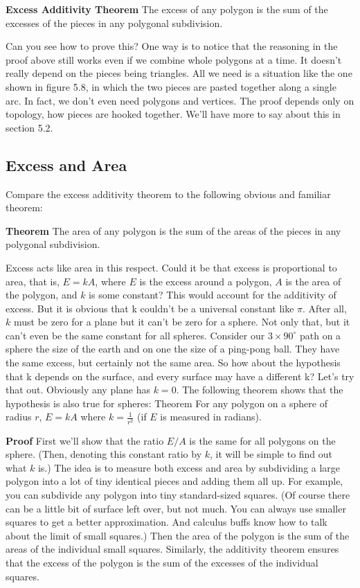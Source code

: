 \documentclass{book}
\begin{document}
\noindent \textbf{Excess Additivity Theorem} The excess of any polygon is the sum of the
excesses of the pieces in any polygonal subdivision.

Can you see how to prove this? One way is to notice that the reasoning
in the proof above still works even if we combine whole polygons at
a time. It doesn't really depend on the pieces being triangles. All we
need is a situation like the one shown in figure 5.8, in which the two
pieces are pasted together along a single arc. In fact, we don't even need
polygons and vertices. The proof depends only on topology, how pieces
are hooked together. We'll have more to say about this in section 5.2.

\subsection{Excess and Area}

Compare the excess additivity theorem to the following obvious and
familiar theorem:

\noindent \textbf{Theorem} The area of any polygon is the sum of the areas of the pieces
in any polygonal subdivision.

Excess acts like area in this respect. Could it be that excess is proportional to area, that is, $E = kA$, where $E$ is the excess around a polygon,
$A$ is the area of the polygon, and $k$ is some constant? This would account 
for the additivity of excess. But it is obvious that k couldn't be
a universal constant like $\pi$. After all, $k$ must be zero for a plane but it
can't be zero for a sphere. Not only that, but it can't even be the same
constant for all spheres. Consider our $3 \times 90^{\circ}$ path on a sphere the size
of the earth and on one the size of a ping-pong ball. They have the same
excess, but certainly not the same area. So how about the hypothesis
that k depends on the surface, and every surface may have a different
k? Let's try that out. Obviously any plane has $k = 0$. The following
theorem shows that the hypothesis is also true for spheres:
Theorem For any polygon on a sphere of radius $r$, $E = kA$ where $k =
\frac{1}{r^2}$ (if $E$ is measured in radians).

\noindent \textbf{Proof} First we'll show that the ratio $E / A$ is the same for all polygons on
the sphere. (Then, denoting this constant ratio by $k$, it will be simple
to find out what $k$ is.) The idea is to measure both excess and area
by subdividing a large polygon into a lot of tiny identical pieces and
adding them all up. For example, you can subdivide any polygon into
tiny standard-sized squares. (Of course there can be a little bit of surface
left over, but not much. You can always use smaller squares to get a
better approximation. And calculus buffs know how to talk about the
limit of small squares.) Then the area of the polygon is the sum of the
areas of the individual small squares. Similarly, the additivity theorem
ensures that the excess of the polygon is the sum of the excesses of the
individual squares.
\end{document}

